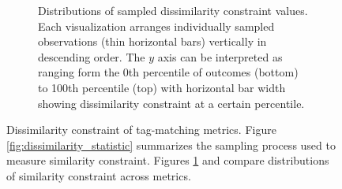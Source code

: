 \begin{figure}
\begin{center}
\begin{subfigure}[b]{\columnwidth}
\caption{
Distributions of sampled dissimilarity constraint values.
Each visualization arranges individually sampled observations (thin horizontal bars) vertically in descending order.
The $y$ axis can be interpreted as ranging form the 0th percentile of outcomes (bottom) to 100th percentile (top) with horizontal bar width showing dissimilarity constraint at a certain percentile.
}
\label{fig:sphere_reverse_barplot}
\end{subfigure}

\caption{
Dissimilarity constraint of tag-matching metrics.
Figure \ref{fig:dissimilarity_statistic} summarizes the sampling process used to measure similarity constraint.
Figures \ref{fig:sphere_reverse_barplot} and  \label{fig:sphere_reverse_distnplot} compare distributions of similarity constraint across metrics.
}
\label{fig:sphere_reverse}

\end{center}
\end{figure}
